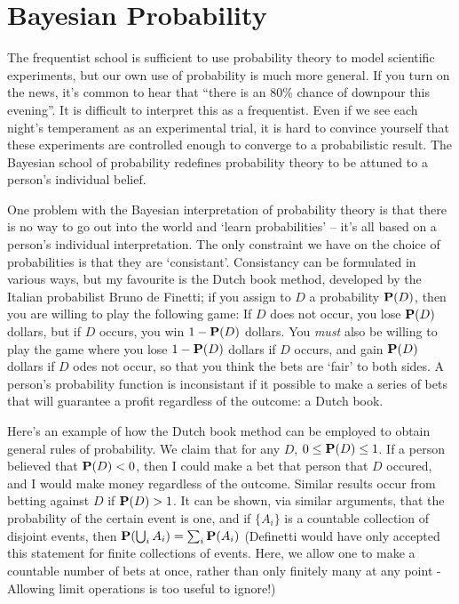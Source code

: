\section{Bayesian Probability}

The frequentist school is sufficient to use probability theory to model scientific experiments, but our own use of probability is much more general. If you turn on the news, it's common to hear that ``there is an 80\% chance of downpour this evening''. It is difficult to interpret this as a frequentist. Even if we see each night's temperament as an experimental trial, it is hard to convince yourself that these experiments are controlled enough to converge to a probabilistic result. The Bayesian school of probability redefines probability theory to be attuned to a person's individual belief.

One problem with the Bayesian interpretation of probability theory is that there is no way to go out into the world and `learn probabilities' -- it's all based on a person's individual interpretation. The only constraint we have on the choice of probabilities is that they are `consistant'. Consistancy can be formulated in various ways, but my favourite is the Dutch book method, developed by the Italian probabilist Bruno de Finetti; if you assign to $D$ a probability $\operatorname{\mathbf{P}}(D)$, then you are willing to play the following game: If $D$ does not occur, you lose $\operatorname{\mathbf{P}}(D)$ dollars, but if $D$ occurs, you win $1 - \operatorname{\mathbf{P}}(D)$ dollars. You {\it must} also be willing to play the game where you lose $1-\operatorname{\mathbf{P}}(D)$ dollars if $D$ occurs, and gain $\operatorname{\mathbf{P}}(D)$ dollars if $D$ odes not occur, so that you think the bets are `fair' to both sides. A person's probability function is inconsistant if it possible to make a series of bets that will guarantee a profit regardless of the outcome: a Dutch book.

Here's an example of how the Dutch book method can be employed to obtain general rules of probability. We claim that for any $D$, $0 \leq \operatorname{\mathbf{P}}(D) \leq 1$. If a person believed that $\operatorname{\mathbf{P}}(D) < 0$, then I could make a bet that person that $D$ occured, and I would make money regardless of the outcome. Similar results occur from betting against $D$ if $\operatorname{\mathbf{P}}(D) > 1$. It can be shown, via similar arguments, that the probability of the certain event is one, and if $\{ A_i \}$ is a countable collection of disjoint events, then $\operatorname{\mathbf{P}}(\bigcup_i A_i) = \sum_i \operatorname{\mathbf{P}}(A_i)$ (Definetti would have only accepted this statement for finite collections of events. Here, we allow one to make a countable number of bets at once, rather than only finitely many at any point - Allowing limit operations is too useful to ignore!)

